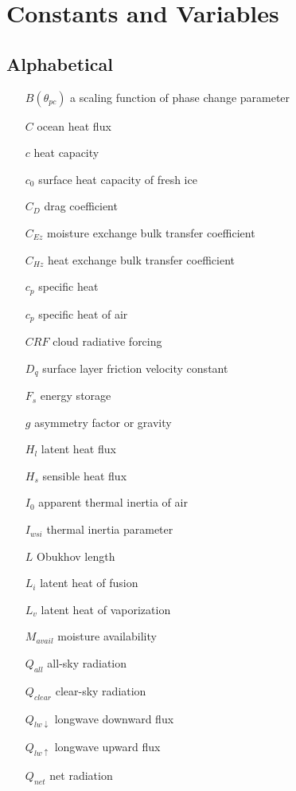 \section{Constants and Variables}
\subsection{Alphabetical}
\begin{enumerate}
   \item[$B(\theta_{pc})$] a scaling function of phase change parameter
    \item[$C$] ocean heat flux
    \item[$c$] heat capacity
    \item[$c_{0}$] surface heat capacity of fresh ice
    \item[$C_{D}$] drag coefficient
    \item[$C_{Ez}$] moisture exchange bulk transfer coefficient
    \item[$C_{Hz}$] heat exchange bulk transfer coefficient
    \item[$c_{p}$] specific heat
    \item[$c_{p}$] specific heat of air
    \item[$CRF$] cloud radiative forcing
    \item[$D_{q}$] surface layer friction velocity constant
    \item[$F_{s}$] energy storage
    \item[$g$] asymmetry factor or gravity
    \item[$H_{l}$] latent heat flux
    \item[$H_{s}$] sensible heat flux
    \item[$I_{0}$] apparent thermal inertia of air 
    \item[$I_{wsi}$] thermal inertia parameter
    \item[$L$] Obukhov length
    \item[$L_{i}$] latent heat of fusion
    \item[$L_{v}$] latent heat of vaporization
    \item[$M_{avail}$] moisture availability
    \item[$Q_{all}$] all-sky radiation
    \item[$Q_{clear}$] clear-sky radiation
    \item[$Q_{lw \downarrow}$] longwave downward flux
    \item[$Q_{lw \uparrow}$] longwave upward flux
    \item[$Q_{net}$] net radiation

\end{enumerate}
